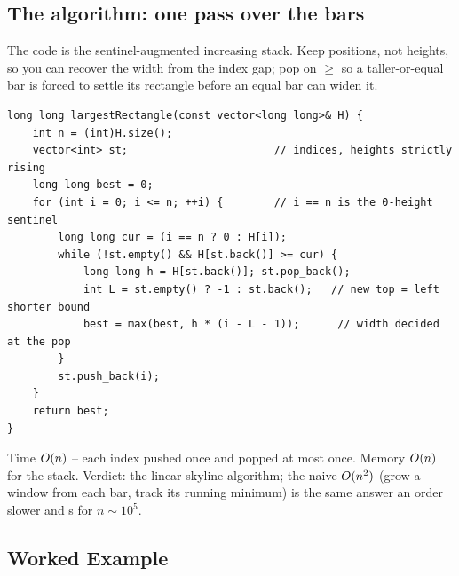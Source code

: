 \subsection{The algorithm: one pass over the bars}

The code is the sentinel-augmented increasing stack. Keep positions, not heights, so you can recover
the width from the index gap; pop on $\ge$ so a taller-or-equal bar is forced to settle its rectangle
before an equal bar can widen it.

\begin{lstlisting}[caption={Largest rectangle in a histogram -- one increasing stack with a zero sentinel}, label={lst:c26-hist}]
long long largestRectangle(const vector<long long>& H) {
    int n = (int)H.size();
    vector<int> st;                       // indices, heights strictly rising
    long long best = 0;
    for (int i = 0; i <= n; ++i) {        // i == n is the 0-height sentinel
        long long cur = (i == n ? 0 : H[i]);
        while (!st.empty() && H[st.back()] >= cur) {
            long long h = H[st.back()]; st.pop_back();
            int L = st.empty() ? -1 : st.back();   // new top = left shorter bound
            best = max(best, h * (i - L - 1));      // width decided at the pop
        }
        st.push_back(i);
    }
    return best;
}
\end{lstlisting}
\begin{complexitybox}
Time $O(n)$ -- each index pushed once and popped at most once. Memory $O(n)$ for the stack.
Verdict: the linear skyline algorithm; the naive $O(n^2)$ (grow a window from each bar, track its
running minimum) is the same answer an order slower and \tle s for $n\sim10^5$.
\end{complexitybox}

\subsection{Worked Example}

